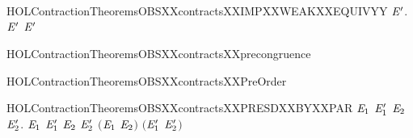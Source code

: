 \newcommand{\HOLContractionTheoremsOBSXXcontractsXXIMPXXWEAKXXEQUIV}{\UseVerbatim{HOLContractionTheoremsOBSXXcontractsXXIMPXXWEAKXXEQUIV}}
\begin{SaveVerbatim}{HOLContractionTheoremsOBSXXcontractsXXIMPXXWEAKXXEQUIVYY}
\HOLTokenTurnstile{} \HOLSymConst{\HOLTokenForall{}} \ensuremath{\HOLBoundVar{E}\sp{\prime{}}}.   \ensuremath{\HOLBoundVar{E}\sp{\prime{}}} \HOLSymConst{\HOLTokenImp{}}   \ensuremath{\HOLBoundVar{E}\sp{\prime{}}}
\end{SaveVerbatim}
\newcommand{\HOLContractionTheoremsOBSXXcontractsXXIMPXXWEAKXXEQUIVYY}{\UseVerbatim{HOLContractionTheoremsOBSXXcontractsXXIMPXXWEAKXXEQUIVYY}}
\begin{SaveVerbatim}{HOLContractionTheoremsOBSXXcontractsXXprecongruence}
\HOLTokenTurnstile{}  
\end{SaveVerbatim}
\newcommand{\HOLContractionTheoremsOBSXXcontractsXXprecongruence}{\UseVerbatim{HOLContractionTheoremsOBSXXcontractsXXprecongruence}}
\begin{SaveVerbatim}{HOLContractionTheoremsOBSXXcontractsXXPreOrder}
\HOLTokenTurnstile{}  
\end{SaveVerbatim}
\newcommand{\HOLContractionTheoremsOBSXXcontractsXXPreOrder}{\UseVerbatim{HOLContractionTheoremsOBSXXcontractsXXPreOrder}}
\begin{SaveVerbatim}{HOLContractionTheoremsOBSXXcontractsXXPRESDXXBYXXPAR}
\HOLTokenTurnstile{} \HOLSymConst{\HOLTokenForall{}}\ensuremath{\HOLBoundVar{E}\sb{\mathrm{1}}} \ensuremath{\HOLBoundVar{E}\sb{\mathrm{1}}\sp{\prime{}}} \ensuremath{\HOLBoundVar{E}\sb{\mathrm{2}}} \ensuremath{\HOLBoundVar{E}\sb{\mathrm{2}}\sp{\prime{}}}.
      \ensuremath{\HOLBoundVar{E}\sb{\mathrm{1}}} \ensuremath{\HOLBoundVar{E}\sb{\mathrm{1}}\sp{\prime{}}} \HOLSymConst{\HOLTokenConj{}}  \ensuremath{\HOLBoundVar{E}\sb{\mathrm{2}}} \ensuremath{\HOLBoundVar{E}\sb{\mathrm{2}}\sp{\prime{}}} \HOLSymConst{\HOLTokenImp{}}
      \ensuremath{(}\ensuremath{\HOLBoundVar{E}\sb{\mathrm{1}}} \HOLSymConst{\ensuremath{\mid}} \ensuremath{\HOLBoundVar{E}\sb{\mathrm{2}}}\ensuremath{)} \ensuremath{(}\ensuremath{\HOLBoundVar{E}\sb{\mathrm{1}}\sp{\prime{}}} \HOLSymConst{\ensuremath{\mid}} \ensuremath{\HOLBoundVar{E}\sb{\mathrm{2}}\sp{\prime{}}}\ensuremath{)}
\end{SaveVerbatim}
\newcommand{\HOLContractionTheoremsOBSXXcontractsXXPRESDXXBYXXPAR}{\UseVerbatim{HOLContractionTheoremsOBSXXcontractsXXPRESDXXBYXXPAR}}
